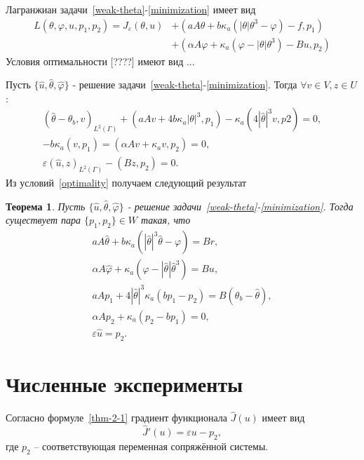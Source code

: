 \documentclass[10pt]{article}
\newtheorem{thm}{\indent Теорема}
\begin{document}
    Лагранжиан задачи~\eqref{weak-theta}-\eqref{minimization} имеет вид
    \begin{equation}
        \label{lagrangian}
        \begin{aligned}
            L(\theta, \varphi, u, p_1, p_2) = J_\varepsilon(\theta, u)
            & + (aA\theta + b\kappa_a(|\theta|\theta^3 - \varphi) - f, p_1) \\
            & + (\alpha A \varphi + \kappa_a(\varphi - |\theta|\theta^3) - Bu, p_2)
        \end{aligned}
    \end{equation}
    Условия оптимальности [????] имеют вид
    ...

    Пусть $\{ \hat{u}, \hat{\theta}, \hat{\varphi} \}$ - решение
    задачи~\eqref{weak-theta}-\eqref{minimization}.
    Тогда $\forall v \in V, z \in U$:
    \begin{gather}
        \label{optimality}
            (\hat{\theta} -\theta_b, v)_{L^2(\Gamma)} + (aAv + 4 b\kappa_a |\theta|^3, p_1)
            - \kappa_a ( 4 |\hat{\theta}|^3v, p2) = 0, \\
            - b \kappa_a (v, p_1) = (\alpha A v + \kappa_a v, p_2) = 0, \\
            \varepsilon (\hat{u},z)_{L^2(\Gamma)} - (Bz, p_2) = 0.
    \end{gather}
    Из условий~\eqref{optimality} получаем следующий результат
    \begin{thm}
        Пусть $\{\hat{u}, \hat{\theta}, \hat{\varphi}\}$ - решение
        задачи~\eqref{weak-theta}-\eqref{minimization}.
        Тогда существует пара $\{p_1, p_2 \} \in W$
        такая, что
        \begin{gather}
            \label{thm-2-1}
            aA\hat{\theta} + b \kappa_a(|\hat{\theta}|^3 \hat{\theta} -\varphi) = Br, \\
            \alpha A \hat{\varphi} + \kappa_a(\hat{\varphi} - |\hat{\theta}|\hat{\theta}^3) = Bu, \\
            aAp_1 +4|\hat{\theta}|^3 \kappa_a(bp_1 - p_2) = B(\theta_b - \hat{\theta}), \\
            \alpha A p_2 + \kappa_a (p_2 - b p_1) = 0, \\
            \varepsilon \hat{u} = p_2.
        \end{gather}
    \end{thm}


    \section{Численные эксперименты}\label{sec:experiments}
    Согласно формуле~\eqref{thm-2-1} градиент функционала $\hat{J}(u)$ имеет вид
    \[ \hat{J}'(u)= \varepsilon u - p_2, \]
    где $p_2$ -- соответствующая переменная сопряжённой системы.
\end{document}
